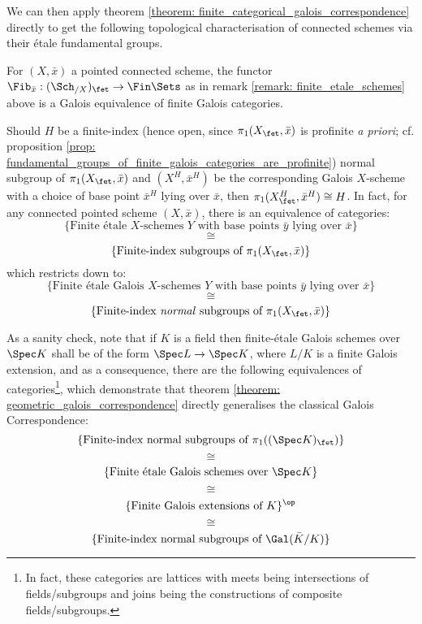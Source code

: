             We can then apply theorem \ref{theorem: finite_categorical_galois_correspondence} directly to get the following topological characterisation of connected schemes via their \'etale fundamental groups.
            \begin{theorem} \label{theorem: geometric_galois_correspondence}
                For $(X, \bar{x})$ a pointed connected scheme, the functor $\Fib_{\bar{x}}: (\Sch_{/X})_{\fet} \to \Fin\Sets$ as in remark \ref{remark: finite_etale_schemes} above is a Galois equivalence of finite Galois categories. 
            \end{theorem}
            \begin{corollary}
                Should $H$ be a finite-index (hence open, since $\pi_1(X_{\fet}, \bar{x})$ is profinite \textit{a priori}; cf. proposition \ref{prop: fundamental_groups_of_finite_galois_categories_are_profinite}) normal subgroup of $\pi_1(X_{\fet}, \bar{x})$ and $(X^H, \bar{x}^H)$ be the corresponding Galois $X$-scheme with a choice of base point $\bar{x}^H$ lying over $\bar{x}$, then $\pi_1(X^H_{\fet}, \bar{x}^H) \cong H$. In fact, for any connected pointed scheme $(X, \bar{x})$, there is an equivalence of categories:
                    $$\{\text{Finite \'etale $X$-schemes $Y$ with base points $\bar{y}$ lying over $\bar{x}$}\}$$
                    $$\cong$$
                    $$\{\text{Finite-index subgroups of $\pi_1(X_{\fet}, \bar{x})$}\}$$
                which restricts down to:
                    $$\{\text{Finite \'etale Galois $X$-schemes $Y$ with base points $\bar{y}$ lying over $\bar{x}$}\}$$
                    $$\cong$$
                    $$\{\text{Finite-index \textit{normal} subgroups of $\pi_1(X_{\fet}, \bar{x})$}\}$$
            \end{corollary}
            \begin{example} \label{example: etale_fundamental_group_of_a_field}
                As a sanity check, note that if $K$ is a field then finite-\'etale Galois schemes over $\Spec K$ shall be of the form $\Spec L \to \Spec K$, where $L/K$ is a finite Galois extension, and as a consequence, there are the following equivalences of categories\footnote{In fact, these categories are lattices with meets being intersections of fields/subgroups and joins being the constructions of composite fields/subgroups.}, which demonstrate that theorem \ref{theorem: geometric_galois_correspondence} directly generalises the classical Galois Correspondence:
                    $$\{\text{Finite-index normal subgroups of $\pi_1((\Spec K)_{\fet})$}\}$$
                    $$\cong$$
                    $$\{\text{Finite \'etale Galois schemes over $\Spec K$}\}$$
                    $$\cong$$
                    $$\{\text{Finite Galois extensions of $K$}\}^{\op}$$
                    $$\cong$$
                    $$\{\text{Finite-index normal subgroups of $\Gal(\bar{K}/K)$}\}$$
            \end{example}

